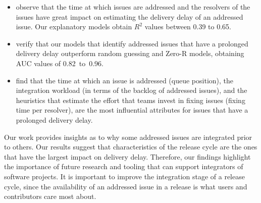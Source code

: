 \begin{itemize}
		\item observe that the time at which issues are addressed and the
			resolvers of the issues have great impact on estimating
			the delivery delay of an addressed issue.  Our explanatory
			models obtain $R^2$ values between 0.39 to 0.65. \\

		\item verify that our models that identify addressed issues that
			have a prolonged delivery delay outperform random
			guessing and Zero-R models, obtaining AUC values of 0.82~to~0.96.\\

		\item find that the time at which an issue is addressed (queue
			position), the integration workload (in terms of the
			backlog of addressed issues), and the
			heuristics that estimate the effort that teams invest in
			fixing issues (fixing time per resolver), are the
			most influential attributes for issues that have 
			a prolonged delivery delay. \\

	\end{itemize}

Our work provides insights as to why some addressed issues are integrated prior
to others. Our results suggest that characteristics of the release cycle are the
ones that have the largest impact on delivery delay. Therefore, our findings
highlight the importance of future research and tooling that can support
integrators of software projects. It is important to improve the integration
stage of a release cycle, since the availability of an addressed issue in a
release is what users and contributors care most about. 

